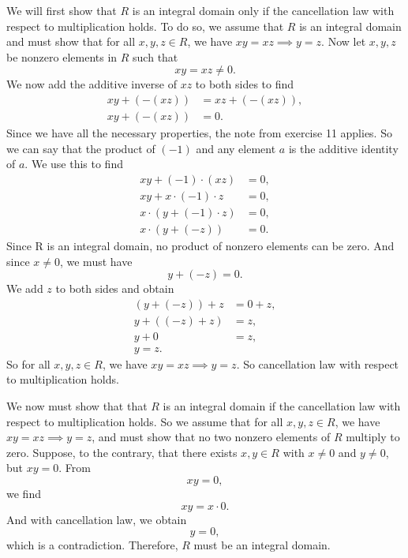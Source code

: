 \documentclass[12pt]{article}
\begin{document}
We will first show that $R$ is an integral domain only if the cancellation law with respect to multiplication holds. To do so, we assume that $R$ is an integral domain and must show that for all $x,y,z\in R$, we have $xy=xz \implies y=z$. Now let $x,y,z$ be nonzero elements in $R$ such that
\[xy=xz\ne 0.\]
We now add the additive inverse of $xz$ to both sides to find
\begin{align*}
    xy + (-(xz)) &= xz + (-(xz)), \\
    xy + (-(xz)) &= 0.
\end{align*}
Since we have all the necessary properties, the note from exercise 11 applies. So we can say that the product of $(-1)$ and any element $a$ is the additive identity of $a$. We use this to find
\begin{align*}
    xy + (-1)\cdot(xz) &= 0, \\
    xy + x\cdot(-1)\cdot z &= 0, \\
    x\cdot(y + (-1)\cdot z) &= 0, \\
    x\cdot(y + (-z)) &= 0.
\end{align*}
Since R is an integral domain, no product of nonzero elements can be zero. And since $x\ne 0$, we must have
\[y + (-z) = 0.\]
We add $z$ to both sides and obtain
\begin{align*}
    (y+(-z)) + z &= 0 + z, \\
    y + ((-z) + z) &= z, \\
    y + 0 &= z, \\
    y = z.
\end{align*}
So for all $x,y,z \in R$, we have $xy=xz \implies y=z$. So cancellation law with respect to multiplication holds.

We now must show that that $R$ is an integral domain if the cancellation law with respect to multiplication holds. So we assume that for all $x,y,z \in R$, we have $xy=xz \implies y=z$, and must show that no two nonzero elements of $R$ multiply to zero. Suppose, to the contrary, that there exists $x,y\in R$ with $x\ne0$ and $y\ne 0$, but $xy=0$. From
\[xy=0,\]
we find
\[xy = x\cdot 0.\]
And with cancellation law, we obtain
\[y = 0,\]
which is a contradiction. Therefore, $R$ must be an integral domain.
\end{document}
